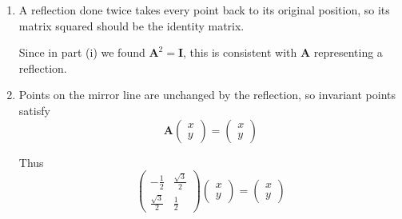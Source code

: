 \documentclass[leqno]{article}
\begin{document}
\begin{enumerate}[
  label=\textbf{\arabic*.},
  leftmargin=*,
  topsep=0pt,
  partopsep=0pt,
  parsep=0pt
]
\begin{djsSolution}
\begin{enumerate}[label=\textbf{(\roman*)}]
Calculating each entry:
\begin{align*}
\mathbf{A}^2
&=
\begin{pmatrix}
\left(-\frac12\right)\left(-\frac12\right)+\left(\frac{\sqrt3}{2}\right)\left(\frac{\sqrt3}{2}\right)
&
\left(-\frac12\right)\left(\frac{\sqrt3}{2}\right)+\left(\frac{\sqrt3}{2}\right)\left(\frac12\right)
\\[8pt]
\left(\frac{\sqrt3}{2}\right)\left(-\frac12\right)+\left(\frac12\right)\left(\frac{\sqrt3}{2}\right)
&
\left(\frac{\sqrt3}{2}\right)\left(\frac{\sqrt3}{2}\right)+\left(\frac12\right)\left(\frac12\right)
\end{pmatrix}\\
&=
\begin{pmatrix}
\frac14+\frac34 & -\frac{\sqrt3}{4}+\frac{\sqrt3}{4}\\[4pt]
-\frac{\sqrt3}{4}+\frac{\sqrt3}{4} & \frac34+\frac14
\end{pmatrix}
=
\begin{pmatrix}
1&0\\[2pt]
0&1
\end{pmatrix}
\end{align*}

\item
A reflection done twice takes every point back to its original position, so its matrix squared should be the identity matrix.

Since in part (i) we found \(\mathbf{A}^2=\mathbf{I}\), this is consistent with \(\mathbf{A}\) representing a reflection.

\item
Points on the mirror line are unchanged by the reflection, so invariant points satisfy
\[
\mathbf{A}\begin{pmatrix}x\\y\end{pmatrix}
=
\begin{pmatrix}x\\y\end{pmatrix}
\]

Thus
\[
\begin{pmatrix}
-\frac12 & \frac{\sqrt3}{2}\\[4pt]
\frac{\sqrt3}{2} & \frac12
\end{pmatrix}
\begin{pmatrix}x\\y\end{pmatrix}
=
\begin{pmatrix}x\\y\end{pmatrix}
\]


\end{enumerate}
\end{djsSolution}
\end{enumerate}
\end{document}
